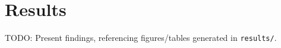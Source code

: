 \section{Results}
\label{sec:results}

TODO: Present findings, referencing figures/tables generated in \texttt{results/}.

